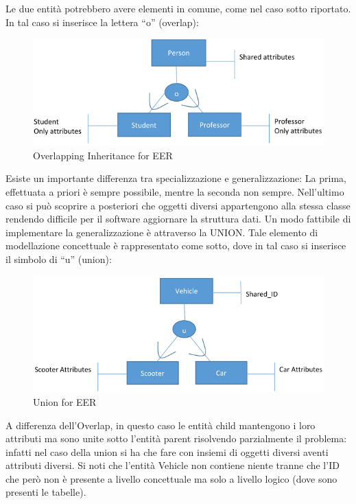 \begin{itemize}
Le due entità potrebbero avere elementi in comune, come nel caso sotto riportato. In tal caso si inserisce la lettera “o” (overlap):

\begin{center}
\begin{figure}[H]
\centering
\includegraphics[scale=1]{figures/overlapping.png}
\caption{Overlapping Inheritance for EER}
\end{figure}
\end{center}

\end{itemize}

Esiste un importante differenza tra specializzazione e generalizzazione: La prima, effettuata a priori è sempre possibile, mentre la seconda non sempre. Nell’ultimo caso si può scoprire a posteriori che oggetti diversi appartengono alla stessa classe rendendo difficile per il software aggiornare la struttura dati. Un modo fattibile di implementare la generalizzazione è attraverso la UNION. Tale elemento di modellazione concettuale è rappresentato come sotto, dove in tal caso si inserisce il simbolo di “u” (union):

\begin{center}
\begin{figure}[H]
\centering
\includegraphics[scale=0.8]{figures/union.png}
\caption{Union for EER}
\end{figure}
\end{center}

A differenza dell’Overlap, in questo caso le entità child mantengono i loro attributi ma sono unite sotto l’entità parent risolvendo parzialmente il problema: infatti nel caso della union si ha che fare con insiemi di oggetti diversi aventi attributi diversi. Si noti che l’entità Vehicle non contiene niente tranne che l’ID che però non è presente a livello concettuale ma solo a livello logico (dove sono presenti le tabelle). 

